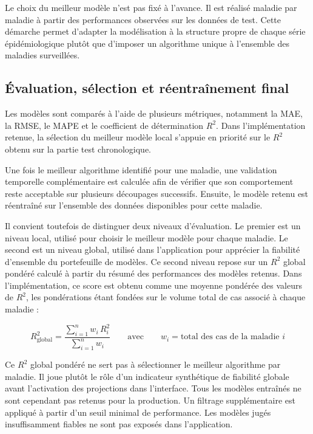 Le choix du meilleur modèle n'est pas fixé à l'avance. Il est réalisé maladie par maladie à partir des performances observées sur les données de test. Cette démarche permet d'adapter la modélisation à la structure propre de chaque série épidémiologique plutôt que d'imposer un algorithme unique à l'ensemble des maladies surveillées.

\subsection{Évaluation, sélection et réentraînement final}

Les modèles sont comparés à l'aide de plusieurs métriques, notamment la MAE, la RMSE, le MAPE et le coefficient de détermination $R^{2}$. Dans l'implémentation retenue, la sélection du meilleur modèle local s'appuie en priorité sur le $R^{2}$ obtenu sur la partie test chronologique.

Une fois le meilleur algorithme identifié pour une maladie, une validation temporelle complémentaire est calculée afin de vérifier que son comportement reste acceptable sur plusieurs découpages successifs. Ensuite, le modèle retenu est réentraîné sur l'ensemble des données disponibles pour cette maladie.

Il convient toutefois de distinguer deux niveaux d'évaluation. Le premier est un niveau local, utilisé pour choisir le meilleur modèle pour chaque maladie. Le second est un niveau global, utilisé dans l'application pour apprécier la fiabilité d'ensemble du portefeuille de modèles. Ce second niveau repose sur un $R^{2}$ global pondéré calculé à partir du résumé des performances des modèles retenus. Dans l'implémentation, ce score est obtenu comme une moyenne pondérée des valeurs de $R^{2}$, les pondérations étant fondées sur le volume total de cas associé à chaque maladie :

\[
R^{2}_{\text{global}} = \frac{\displaystyle\sum_{i=1}^{n} w_i \, R^{2}_i}{\displaystyle\sum_{i=1}^{n} w_i}
\qquad \text{avec} \qquad w_i = \text{total des cas de la maladie } i
\]

Ce $R^{2}$ global pondéré ne sert pas à sélectionner le meilleur algorithme par maladie. Il joue plutôt le rôle d'un indicateur synthétique de fiabilité globale avant l'activation des projections dans l'interface. Tous les modèles entraînés ne sont cependant pas retenus pour la production. Un filtrage supplémentaire est appliqué à partir d'un seuil minimal de performance. Les modèles jugés insuffisamment fiables ne sont pas exposés dans l'application.

